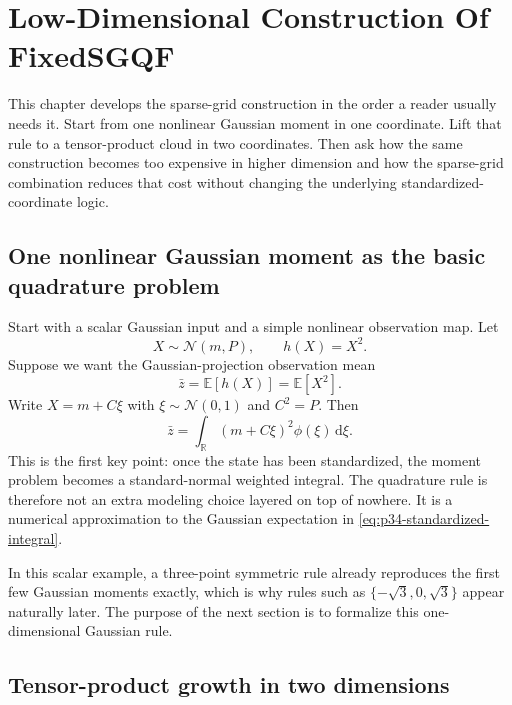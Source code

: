 \documentclass[11pt]{article}
\numberwithin{equation}{section}
\newcommand{\R}{\mathbb R}
\newcommand{\E}{\mathbb E}
\newcommand{\N}{\mathcal N}
\newcommand{\dd}{\,\mathrm d}
\begin{document}
\section{Low-Dimensional Construction Of FixedSGQF}
\label{sec:p34-motivating-cases}

This chapter develops the sparse-grid construction in the order a reader usually
needs it.  Start from one nonlinear Gaussian moment in one coordinate.  Lift that
rule to a tensor-product cloud in two coordinates.  Then ask how the same
construction becomes too expensive in higher dimension and how the sparse-grid
combination reduces that cost without changing the underlying standardized-coordinate
logic.

\subsection{One nonlinear Gaussian moment as the basic quadrature problem}
\label{subsec:p34-scalar-motivation}

Start with a scalar Gaussian input and a simple nonlinear observation map.
Let
\begin{equation}
  X\sim\N(m,P),
  \qquad
  h(X)=X^2.
  \label{eq:p34-scalar-gaussian-model}
\end{equation}
Suppose we want the Gaussian-projection observation mean
\begin{equation}
  \bar z = \E[h(X)] = \E[X^2].
  \label{eq:p34-scalar-target-mean}
\end{equation}
Write \(X=m+C\xi\) with \(\xi\sim\N(0,1)\) and \(C^2=P\).  Then
\begin{equation}
  \bar z
  =
  \int_{\R} (m+C\xi)^2\phi(\xi)\dd\xi.
  \label{eq:p34-standardized-integral}
\end{equation}
This is the first key point: once the state has been standardized, the moment
problem becomes a standard-normal weighted integral.  The quadrature rule is
therefore not an extra modeling choice layered on top of nowhere.  It is a
numerical approximation to the Gaussian expectation in
\eqref{eq:p34-standardized-integral}.

In this scalar example, a three-point symmetric rule already reproduces the
first few Gaussian moments exactly, which is why rules such as
\(\{-\sqrt3,0,\sqrt3\}\) appear naturally later.  The purpose of the next
section is to formalize this one-dimensional Gaussian rule.

\subsection{Tensor-product growth in two dimensions}
\label{subsec:p34-2d-motivation}
\end{document}
